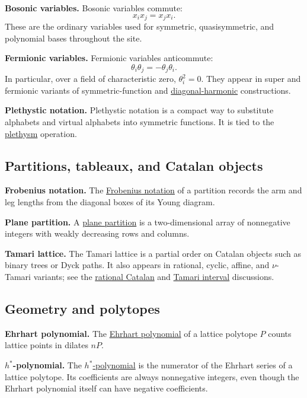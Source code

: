 \textbf{Bosonic variables.}
Bosonic variables commute:
\[
  x_i x_j = x_j x_i.
\]
These are the ordinary variables used for symmetric, quasisymmetric, and
polynomial bases throughout the site.

\textbf{Fermionic variables.}
Fermionic variables anticommute:
\[
  \theta_i\theta_j=-\theta_j\theta_i.
\]
In particular, over a field of characteristic zero, \(\theta_i^2=0\).
They appear in super and fermionic variants of symmetric-function and
\hyperref[diagonalHarmonics]{diagonal-harmonic} constructions.

\textbf{Plethystic notation.}
Plethystic notation is a compact way to substitute alphabets and virtual
alphabets into symmetric functions.  It is tied to the
\hyperref[plethysm]{plethysm} operation.


\subsection[dictionaryPartitionsTableaux]{Partitions, tableaux, and Catalan objects}

\textbf{Frobenius notation.}
The \hyperref[frobeniusCoordinates]{Frobenius notation} of a partition records
the arm and leg lengths from the diagonal boxes of its Young diagram.

\textbf{Plane partition.}
A \hyperref[planePartitions]{plane partition} is a two-dimensional array of
nonnegative integers with weakly decreasing rows and columns.

\textbf{Tamari lattice.}
The Tamari lattice is a partial order on Catalan objects such as binary trees
or Dyck paths.  It also appears in rational, cyclic, affine, and
\(\nu\)-Tamari variants; see the \hyperref[cspRationalCatalan]{rational
Catalan} and \hyperref[tamariInterval]{Tamari interval} discussions.


\subsection[dictionaryGeometryPolytopes]{Geometry and polytopes}

\textbf{Ehrhart polynomial.}
The \hyperref[ehrhartPolynomialDefinition]{Ehrhart polynomial} of a lattice
polytope \(P\) counts lattice points in dilates \(nP\).

\textbf{\(h^*\)-polynomial.}
The \hyperref[hStarPolynomial]{\(h^*\)-polynomial} is the numerator of the
Ehrhart series of a lattice polytope.  Its coefficients are always
nonnegative integers, even though the Ehrhart polynomial itself can have
negative coefficients.

